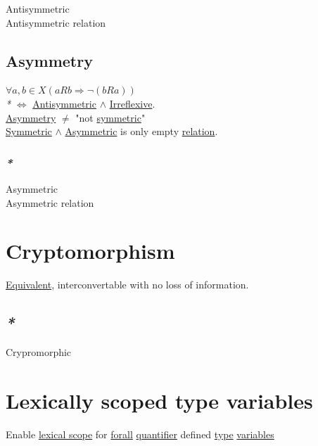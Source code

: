 \documentclass[a4paper,14pt,oneside]{book}
\begin{document}
\label{orged08395}Antisymmetric\\
\label{org2d667af}Antisymmetric relation\\

\section{\label{org7541028}Asymmetry}
\label{sec:org854cac5}

\(\forall a,b \in X (aRb \Rightarrow \neg (bRa))\)\\
\emph{*} \(\iff\) \hyperref[orged08395]{Antisymmetric} \(\land\) \hyperref[orgb45dd18]{Irreflexive}.\\
\hyperref[org7541028]{Asymmetry} \(\ne\) "not \hyperref[org22264e6]{symmetric}"\\
\hyperref[org22264e6]{Symmetric} \(\land\) \hyperref[orgd0755c8]{Asymmetric} is only empty \hyperref[org70d7aba]{relation}.\\

\subsection{\emph{*}}
\label{sec:orgb96cef1}

\label{orgd0755c8}Asymmetric\\
\label{orgea22f99}Asymmetric relation\\

\chapter{\label{org85a2ecd}Cryptomorphism}
\label{sec:orgfcc9206}

\hyperref[orgf83400f]{Equivalent}, interconvertable with no loss of information.\\

\section{\emph{*}}
\label{sec:org885ba46}

\label{orge80ec89}Crypromorphic\\

\chapter{\label{org6b318e3}Lexically scoped type variables}
\label{sec:org55ad044}

Enable \hyperref[org4c9b325]{lexical scope} for \hyperref[org746410f]{forall} \hyperref[org3c92bbc]{quantifier} defined \hyperref[orgd6db20c]{type} \hyperref[org8831698]{variables}\\
\end{document}
